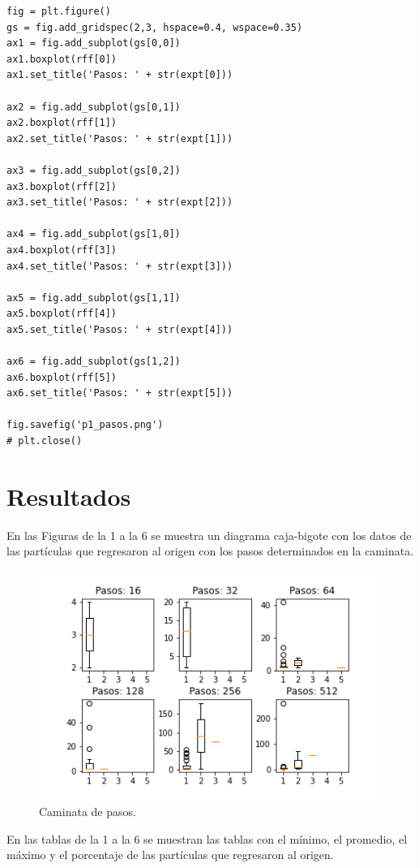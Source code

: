 \documentclass{article}
\begin{document}
\begin{verbatim}
fig = plt.figure()
gs = fig.add_gridspec(2,3, hspace=0.4, wspace=0.35)
ax1 = fig.add_subplot(gs[0,0])
ax1.boxplot(rff[0])
ax1.set_title('Pasos: ' + str(expt[0]))

ax2 = fig.add_subplot(gs[0,1])
ax2.boxplot(rff[1])
ax2.set_title('Pasos: ' + str(expt[1]))
                      
ax3 = fig.add_subplot(gs[0,2])
ax3.boxplot(rff[2])
ax3.set_title('Pasos: ' + str(expt[2]))

ax4 = fig.add_subplot(gs[1,0])
ax4.boxplot(rff[3])
ax4.set_title('Pasos: ' + str(expt[3]))

ax5 = fig.add_subplot(gs[1,1])
ax5.boxplot(rff[4])
ax5.set_title('Pasos: ' + str(expt[4]))

ax6 = fig.add_subplot(gs[1,2])
ax6.boxplot(rff[5])
ax6.set_title('Pasos: ' + str(expt[5]))

fig.savefig('p1_pasos.png')
# plt.close()
\end{verbatim}
\newpage
\section{Resultados}
En las Figuras de la 1 a la 6 se muestra un diagrama caja-bigote con los datos de las partículas que regresaron al origen con los pasos determinados en la caminata.

\begin{figure}[H]
\centering
\includegraphics[width=120mm]{p1_pasos.png}
\caption{\label{fig1}Caminata de pasos.}
\end{figure}


En las tablas de la 1 a la 6 se muestran las tablas con el mínimo, el promedio, el máximo y el porcentaje de las partículas que regresaron al origen.\\
\end{document}
